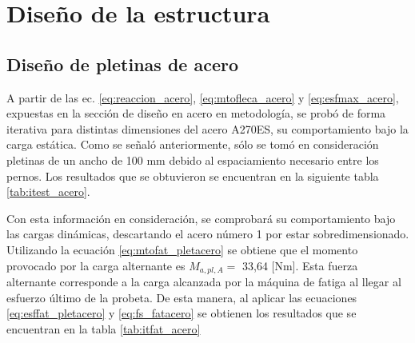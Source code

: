 \section{Diseño de la estructura}
\subsection{Diseño de pletinas de acero}
A partir de las ec. \ref{eq:reaccion_acero}, \ref{eq:mtofleca_acero} y \ref{eq:esfmax_acero}, expuestas en la sección de diseño en acero en metodología, se probó de forma iterativa para distintas dimensiones del acero A270ES, su comportamiento bajo la carga estática. Como se señaló anteriormente, sólo se tomó en consideración pletinas de un ancho de 100 mm debido al espaciamiento necesario entre los pernos. Los resultados que se obtuvieron se encuentran en la siguiente tabla \ref{tab:itest_acero}.

\begin{table}[h]
\centering
{}
\caption{Resultados y factor de seguridad para distintas configuraciones de pletinas de acero.}
\label{tab:itest_acero}
\end{table}

Con esta información en consideración, se comprobará su comportamiento bajo las cargas dinámicas, descartando el acero número 1 por estar sobredimensionado. Utilizando la ecuación \ref{eq:mtofat_pletacero} se obtiene que el momento provocado por la carga alternante es $M_{a,pl,A} =$ 33,64 [Nm]. Esta fuerza alternante corresponde a la carga alcanzada por la máquina de fatiga al llegar al esfuerzo último de la probeta. De esta manera, al aplicar las ecuaciones \ref{eq:esffat_pletacero} y \ref{eq:fs_fatacero} se obtienen los resultados que se encuentran en la tabla \ref{tab:itfat_acero}

